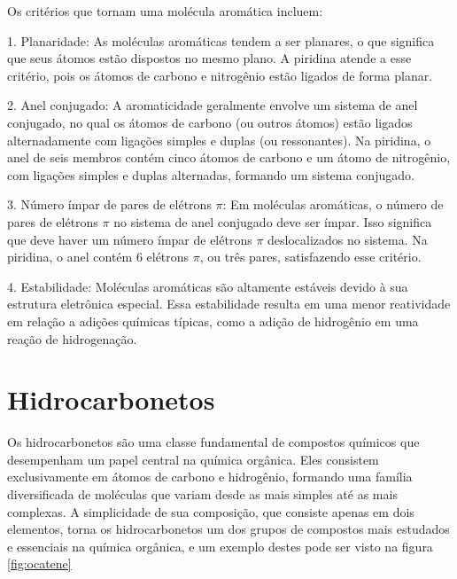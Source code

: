 \documentclass[a4paper,12pt]{book}
\begin{document}
Os critérios que tornam uma molécula aromática incluem:

1. Planaridade: As moléculas aromáticas tendem a ser planares, o que significa que seus átomos estão dispostos no mesmo plano. A piridina atende a esse critério, pois os átomos de carbono e nitrogênio estão ligados de forma planar.

2. Anel conjugado: A aromaticidade geralmente envolve um sistema de anel conjugado, no qual os átomos de carbono (ou outros átomos) estão ligados alternadamente com ligações simples e duplas (ou ressonantes). Na piridina, o anel de seis membros contém cinco átomos de carbono e um átomo de nitrogênio, com ligações simples e duplas alternadas, formando um sistema conjugado.

3. Número ímpar de pares de elétrons {$\pi$}: Em moléculas aromáticas, o número de pares de elétrons {$\pi$} no sistema de anel conjugado deve ser ímpar. Isso significa que deve haver um número ímpar de elétrons {$\pi$} deslocalizados no sistema. Na piridina, o anel contém 6 elétrons {$\pi$}, ou três pares, satisfazendo esse critério.

4. Estabilidade: Moléculas aromáticas são altamente estáveis devido à sua estrutura eletrônica especial. Essa estabilidade resulta em uma menor reatividade em relação a adições químicas típicas, como a adição de hidrogênio em uma reação de hidrogenação.




\chapter{Hidrocarbonetos}
Os hidrocarbonetos são uma classe fundamental de compostos químicos que desempenham um papel central na química orgânica. Eles consistem exclusivamente em átomos de carbono e hidrogênio, formando uma família diversificada de moléculas que variam desde as mais simples até as mais complexas. A simplicidade de sua composição, que consiste apenas em dois elementos, torna os hidrocarbonetos um dos grupos de compostos mais estudados e essenciais na química orgânica, e um exemplo destes pode ser visto na figura \ref{fig:ocatene}
\end{document}
